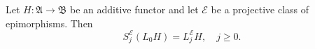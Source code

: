 Let $H : \mathfrak{A} \rightarrow \mathfrak{B}$ be an additive functor and let $\mathcal{E}$ be a projective class of epimorphisms. Then
$$S_j^{\mathcal{E}}(L_0 H) = L_j^{\mathcal{E}} H, \quad j \geq 0.$$
